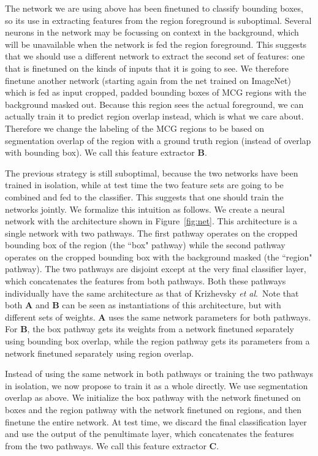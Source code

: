 \documentclass[runningheads]{llncs}
\newcommand\etal{\emph{et al}.\ }
\newcommand\methodA{\textbf{A}}
\newcommand\methodB{\textbf{B}}
\newcommand\methodC{\textbf{C}}
\begin{document}
The network we are using above has been finetuned to classify bounding boxes, so its use in extracting features from the region foreground is suboptimal. Several neurons in the network may be focussing on context in the background, which will be unavailable when the network is fed the region foreground. This suggests that we should use a different network to extract the second set of features: one that is finetuned on the kinds of inputs that it is going to see. We therefore finetune another network (starting again from the net trained on ImageNet) which is fed as input cropped, padded bounding boxes of MCG regions with the background masked out. Because this region sees the actual foreground, we can actually train it to predict region overlap instead, which is what we care about. Therefore we change the labeling of the MCG regions to be based on segmentation overlap of the region with a ground truth region (instead of overlap with bounding box). We call this feature extractor \textbf{\methodB{}}.

The previous strategy is still suboptimal, because the two networks have been trained in isolation, while at test time the two feature sets are going to be combined and fed to the classifier. This suggests that one should train the networks jointly. We formalize this intuition as follows. We create a neural network with the architecture shown in Figure~\ref{fig:net}. This architecture is a single network with two pathways. The first pathway operates on the cropped bounding box of the region (the ``box" pathway) while the second pathway operates on the cropped bounding box with the background masked (the ``region" pathway). The two pathways are disjoint except at the very final classifier layer, which concatenates the features from both pathways. Both these pathways individually have the same architecture as that of Krizhevsky \etal Note that both \methodA{} and \methodB{} can be seen as instantiations of this architecture, but with different sets of weights. \methodA{} uses the same network parameters for both pathways. For \methodB{}, the box pathway gets its weights from a network finetuned separately using bounding box overlap, while the region pathway gets its parameters from a network finetuned separately using region overlap. 

Instead of using the same network in both pathways or training the two pathways in isolation, we now propose to train it as a whole directly. We use segmentation overlap as above. We initialize the box pathway with the network finetuned on boxes and the region pathway with the network finetuned on regions, and then finetune the entire network. At test time, we discard the final classification layer and use the output of the penultimate layer, which concatenates the features from the two pathways. We call this feature extractor \textbf{\methodC{}}.
\end{document}

